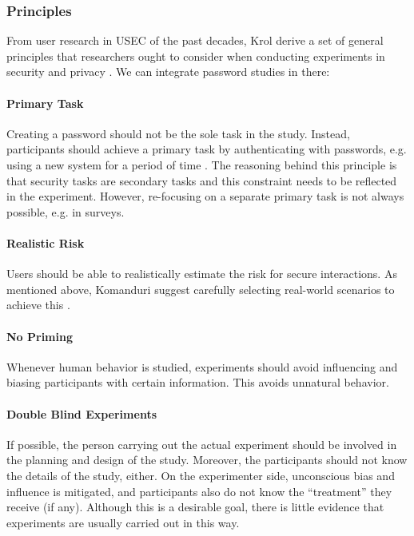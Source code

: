 \subsubsection{Principles}
From user research in \acrshort{USEC} of the past decades, Krol \etal derive a set of general principles that researchers ought to consider when conducting experiments in security and privacy \cite{Krol2016ExperimentDesign}. We can integrate password studies in there:
\paragraph{Primary Task} Creating a password should not be the sole task in the study. Instead, participants should achieve a primary task by authenticating with passwords, e.g. using a new system for a period of time \cite{Brostoff2000PassfacesEvaluation}. The reasoning behind this principle is that security tasks are secondary tasks and this constraint needs to be reflected in the experiment. However, re-focusing on a separate primary task is not always possible, e.g. in surveys. 
\vspace*{-0.5cm}
\paragraph{Realistic Risk} Users should be able to realistically estimate the risk for secure interactions. As mentioned above, Komanduri \etal suggest carefully selecting real-world scenarios to achieve this \cite{Komanduri2011OfPasswordsAndPeople}.
\vspace*{-0.5cm}
\paragraph{No Priming} Whenever human behavior is studied, experiments should avoid influencing and biasing participants with certain information. This avoids unnatural behavior.  
\vspace*{-0.5cm}
\paragraph{Double Blind Experiments} If possible, the person carrying out the actual experiment should be involved in the planning and design of the study. Moreover, the participants should not know the details of the study, either. On the experimenter side, unconscious bias and influence is mitigated, and participants also do not know the ``treatment'' they receive (if any). Although this is a desirable goal, there is little evidence that experiments are usually carried out in this way. 
\vspace*{-0.5cm}
